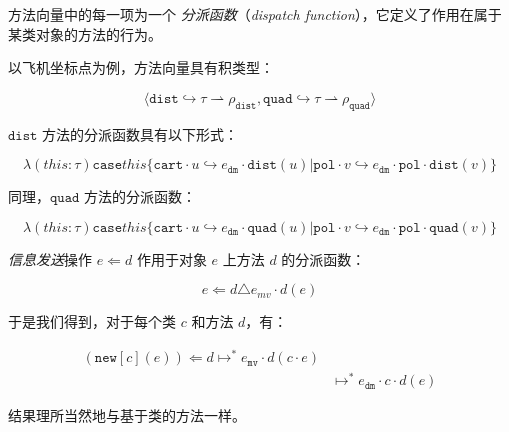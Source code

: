 方法向量中的每一项为一个 \textit{分派函数}（\textit{dispatch function}），它定义了作用在属于某类对象的方法的行为。

以飞机坐标点为例，方法向量具有积类型：

$$ \langle {\mathtt{dist}} \hookrightarrow \tau \rightharpoonup \rho_{\mathtt{dist}}, {\mathtt{quad}} \hookrightarrow \tau \rightharpoonup \rho_{\mathtt{quad}} \rangle $$

$\mathtt{dist}$ 方法的分派函数具有以下形式：

$$ \lambda(this : \tau) {\mathtt{case}} this \{ {\mathtt{cart}} \cdot u \hookrightarrow e_{\mathtt{dm}} \cdot {\mathtt{dist}}(u) | {\mathtt{pol}} \cdot v \hookrightarrow e_{\mathtt{dm}} \cdot {\mathtt{pol}} \cdot {\mathtt{dist}}(v) \}$$

同理，$\mathtt{quad}$ 方法的分派函数：

$$ \lambda(this : \tau) {\mathtt{case}} this \{ {\mathtt{cart}} \cdot u \hookrightarrow e_{\mathtt{dm}} \cdot {\mathtt{quad}}(u) | {\mathtt{pol}} \cdot v \hookrightarrow e_{\mathtt{dm}} \cdot {\mathtt{pol}} \cdot {\mathtt{quad}}(v) \}$$

\textit{信息发送}操作 $e \Leftarrow d$ 作用于对象 $e$ 上方法 $d$ 的分派函数：

$$ e \Leftarrow d \triangle e_{mv} \cdot d(e) $$

于是我们得到，对于每个类 $c$ 和方法 $d$，有：

$$
\begin{aligned}
({\mathtt{new}}[c](e)) \Leftarrow d \longmapsto^{*} e_{\mathtt{mv}} \cdot d(c \cdot e) \\ & \longmapsto^{*} e_{\mathtt{dm}} \cdot c \cdot d(e)
\end{aligned}
$$

结果理所当然地与基于类的方法一样。